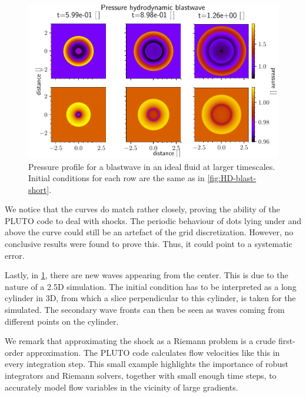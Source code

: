 \begin{figure}[H]
	\centering
	\includegraphics[width=\linewidth]{images/HD-blast-prs-2.pdf}
	\caption{Pressure profile for a blastwave in an ideal fluid at larger timescales. Initial conditions for each row are the same as in \cref{fig:HD-blast-short}.}
	\label{fig:HD-blast-long}
\end{figure}

We notice that the curves do match rather closely, proving the ability of the PLUTO code to deal with shocks. 
The periodic behaviour of dots lying under and above the curve could still be an artefact of the grid discretization. However, no conclusive results were found to prove this. Thus, it could point to a systematic error.

Lastly, in \cref{fig:HD-blast-long}, there are new waves appearing from the center. This is due to the nature of a 2.5D simulation.
The initial condition has to be interpreted as a long cylinder in 3D, from which a slice perpendicular to this cylinder, is taken for the simulated. 
The secondary wave fronts can then be seen as waves coming from different points on the cylinder.

We remark that approximating the shock as a Riemann problem is a crude first-order approximation. 
The PLUTO code calculates flow velocities like this in every integration step. 
This small example highlights the importance of robust integrators and Riemann solvers, together with small enough time steps, to accurately model flow variables in the vicinity of large gradients.


